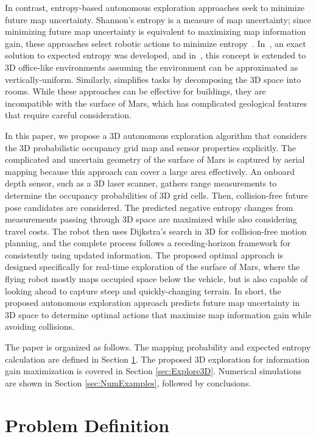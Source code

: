 \documentclass[conf]{new-aiaa}
\begin{document}
In contrast, entropy-based autonomous exploration approaches seek to minimize future map uncertainty. Shannon's entropy is a measure of map uncertainty; since minimizing future map uncertainty is equivalent to maximizing map information gain, these approaches select robotic actions to minimize entropy~\cite{StaGriBur05}. In~\cite{KauAiLee16}, an exact solution to expected entropy was developed, and in~\cite{KauTakAiLee18}, this concept is extended to 3D office-like environments assuming the environment can be approximated as vertically-uniform. Similarly, \cite{MauDakPet14} simplifies tasks by decomposing the 3D space into rooms. While these approaches can be effective for buildings, they are incompatible with the surface of Mars, which has complicated geological features that require careful consideration.

In this paper, we propose a 3D autonomous exploration algorithm that considers the 3D probabilistic occupancy grid map and sensor properties explicitly. The complicated and uncertain geometry of the surface of Mars is captured by aerial mapping because this approach can cover a large area effectively. An onboard depth sensor, such as a 3D laser scanner, gathers range measurements to determine the occupancy probabilities of 3D grid cells. Then, collision-free future pose candidates are considered. The predicted negative entropy changes from measurements passing through 3D space are maximized while also considering travel costs. The robot then uses Dijkstra's search in 3D for collision-free motion planning, and the complete process follows a receding-horizon framework for consistently using updated information. The proposed optimal approach is designed specifically for real-time exploration of the surface of Mars, where the flying robot mostly maps occupied space below the vehicle, but is also capable of looking ahead to capture steep and quickly-changing terrain. In short, the proposed autonomous exploration approach predicts future map uncertainty in 3D space to determine optimal actions that maximize map information gain while avoiding collisions.

The paper is organized as follows. The mapping probability and expected entropy calculation are defined in Section \ref{sec:ProbDef}. The proposed 3D exploration for information gain maximization is covered in Section \ref{sec:Explore3D}. Numerical simulations are shown in Section \ref{sec:NumExamples}, followed by conclusions.

\section{Problem Definition}
\label{sec:ProbDef}
\end{document}
